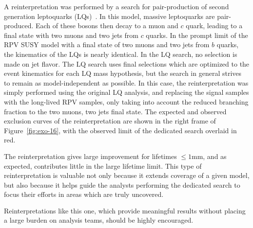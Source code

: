 A reinterpretation was performed by a search for pair-production of second
generation leptoquarks (LQs)~\cite{CMS-PAS-EXO-16-007}. In this model, massive
leptoquarks are pair-produced.  Each of these bosons then decay to a muon and
$c$ quark, leading to a final state with two muons and two jets from $c$ quarks.
In the prompt limit of the RPV SUSY model with a final state of two muons and
two jets from $b$ quarks, the kinematics of the LQs is nearly identical. In the
LQ search, no selection is made on jet flavor. The LQ search uses final
selections which are optimized to the event kinematics for each LQ mass
hypothesis, but the search in general strives to remain as model-independent as
possible. In this case, the reinterpretation was simply performed using the
original LQ analysis, and replacing the signal samples with the long-lived RPV
samples, only taking into account the reduced branching fraction to the two
muons, two jets final state. The expected and observed exclusion curves of the
reinterpretation are shown in the right frame of Figure~\ref{fig:exo-16}, with
the observed limit of the dedicated search overlaid in red.

The reinterpretation gives large improvement for lifetimes $\leq1$mm, and as
expected, contributes little in the large lifetime limit. This type of
reinterpretation is valuable not only because it extends coverage of a given
model, but also because it helps guide the analysts performing the dedicated
search to focus their efforts in areas which are truly uncovered.

Reinterpretations like this one, which provide meaningful results without
placing a large burden on analysis teams, should be highly encouraged.

